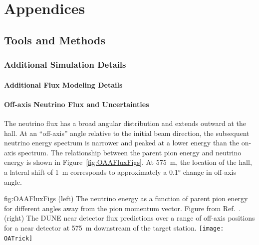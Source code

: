 \chapter{Appendices}
\label{ch:phys-appx}


%

%

\section{Tools and Methods}
\label{sec:tools-appendix}

\subsection{Additional Simulation Details}

\subsubsection{Additional Flux Modeling Details}
\label{sec:tools-app-flx}

\subsubsection{Off-axis Neutrino Flux and Uncertainties}
\label{sec:tools-app-flx-offaxis}

The neutrino flux has a broad angular distribution and extends outward at the  hall. At an ``off-axis'' angle relative to the initial beam direction, the subsequent neutrino energy spectrum is narrower and peaked at a lower energy than the on-axis spectrum.
The relationship between the parent pion energy and neutrino energy is shown in Figure~\ref{fig:OAAFluxFigs}.  At \SI{575}{m}, the location of the  hall, a lateral shift of \SI{1}{m} corresponds to approximately a \ang{0.1} change in off-axis angle.

\begin{dunefigure}{fig:OAAFluxFigs}
{(left) The neutrino energy as a function of parent pion energy for different angles away from the pion momentum vector. Figure from Ref.~\cite{Duffy:2016owt}. (right) The DUNE near detector flux predictions over a range of off-axis positions for a near detector at \SI{575}{m} downstream of the target station. }
    \texttt{[image: OATrick]}
\end{dunefigure}

